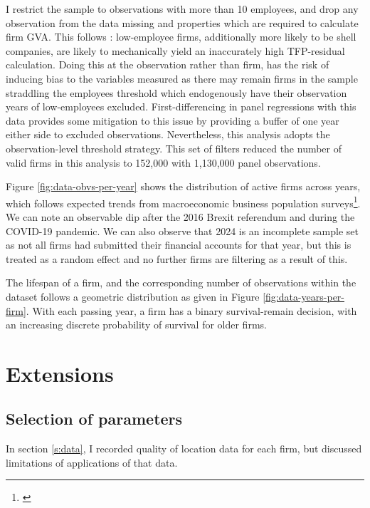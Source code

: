 \par
I restrict the sample to observations with more than 10 employees,
and drop any observation from the  data missing  and 
properties which are required to calculate firm GVA.
This follows \cite{Irastorza-Fadrique2026}: low-employee firms, additionally more likely to be shell companies,
are likely to mechanically yield an inaccurately high TFP-residual calculation.
Doing this at the observation rather than firm, has the risk of inducing bias to the variables measured
as there may remain firms in the sample straddling the employees threshold
which endogenously have their observation years of low-employees excluded.
First-differencing in panel regressions with this data provides some mitigation to this issue
by providing a buffer of one year either side to excluded observations.
Nevertheless, this analysis adopts the observation-level threshold strategy.
This set of filters reduced the number of valid firms in this analysis to 152,000
with 1,130,000 panel observations.
\par
Figure \ref{fig:data-obvs-per-year} shows the distribution of active firms across years,
which follows expected trends from macroeconomic business population
surveys\footnote{\cite{dbt2025:businesspop}}.
We can note an observable dip after the 2016 Brexit referendum and during the COVID-19 pandemic.
We can also observe that 2024 is an incomplete sample set as not all firms
had submitted their financial accounts for that year,
but this is treated as a random effect and no further firms are filtering as a result of this.
\par
The lifespan of a firm, and the corresponding number of  observations within the dataset
follows a geometric distribution as given in Figure \ref{fig:data-years-per-firm}.
With each passing year, a firm has a binary survival-remain decision,
with an increasing discrete probability of survival for older firms.

\newpage
\section{Extensions}
\subsection{Selection of parameters}
\label{ss:param-select-xvalidate}

In section \ref{s:data}, I recorded quality of location data
for each firm, but discussed limitations of applications of that data.

